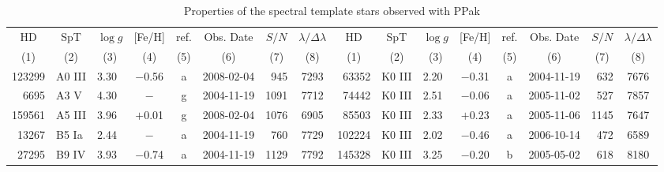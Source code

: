 %
\begin{table}
\caption{\label{tab:TempStars}
Properties of the spectral template stars observed with PPak}
\centering
%
{\tiny
\renewcommand{\tabcolsep}{1.95mm}
\begin{tabular}{|r l l c c c r c || r l l c c c r c|}
\hline
\multicolumn{1}{|c}{HD}                      &
\multicolumn{1}{c}{SpT}                      &
\multicolumn{1}{c}{$\log g$}                 &
\multicolumn{1}{c}{[Fe/H]}                   &
\multicolumn{1}{c}{ref.}                     &
\multicolumn{1}{c}{Obs. Date}                &
\multicolumn{1}{c}{$S/N$}                    &
\multicolumn{1}{c||}{$\lambda/\Delta\lambda$}&
\multicolumn{1}{c}{HD}                       &
\multicolumn{1}{c}{SpT}                      &
\multicolumn{1}{c}{$\log g$}                 &
\multicolumn{1}{c}{[Fe/H]}                   &
\multicolumn{1}{c}{ref.}                     &
\multicolumn{1}{c}{Obs. Date}                &
\multicolumn{1}{c}{$S/N$}                    &
\multicolumn{1}{c|}{$\lambda/\Delta\lambda$} \\
%
\multicolumn{1}{|c}{(1)} &
\multicolumn{1}{c}{(2)}  &
\multicolumn{1}{c}{(3)}  &
\multicolumn{1}{c}{(4)}  &
\multicolumn{1}{c}{(5)}  &
\multicolumn{1}{c}{(6)}  &
\multicolumn{1}{c}{(7)}  &
\multicolumn{1}{c||}{(8)}&
\multicolumn{1}{c}{(1)}  &
\multicolumn{1}{c}{(2)}  &
\multicolumn{1}{c}{(3)}  &
\multicolumn{1}{c}{(4)}  &
\multicolumn{1}{c}{(5)}  &
\multicolumn{1}{c}{(6)}  &
\multicolumn{1}{c}{(7)}  &
\multicolumn{1}{c|}{(8)} \\
%
\hline
123299 & A0 III   & 3.30 & $-$0.56 & a & 2008-02-04 &  945 & 7293 &  63352 & K0 III   & 2.20 & $-$0.31 & a & 2004-11-19 &  632 & 7676 \\
  6695 & A3 V     & 4.30 & $-$     & g & 2004-11-19 & 1091 & 7712 &  74442 & K0 III   & 2.51 & $-$0.06 & a & 2005-11-02 &  527 & 7857 \\
159561 & A5 III   & 3.96 & $+$0.01 & g & 2008-02-04 & 1076 & 6905 &  85503 & K0 III   & 2.33 & $+$0.23 & a & 2005-11-06 & 1145 & 7647 \\
 13267 & B5 Ia    & 2.44 & $-$     & a & 2004-11-19 &  760 & 7729 & 102224 & K0 III   & 2.02 & $-$0.46 & a & 2006-10-14 &  472 & 6589 \\
 27295 & B9 IV    & 3.93 & $-$0.74 & a & 2004-11-19 & 1129 & 7792 & 145328 & K0 III   & 3.25 & $-$0.20 & b & 2005-05-02 &  618 & 8180 \\

\end{tabular}}
\end{table}

